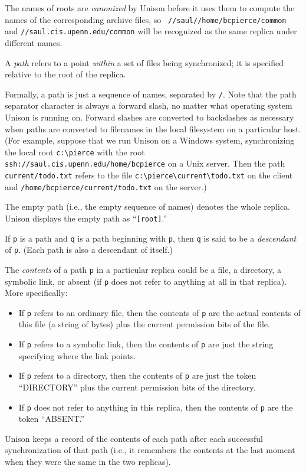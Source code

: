\documentclass{article}
\begin{document}
The names of roots are {\em canonized} by Unison before it uses them
to compute the names of the corresponding archive files, so {\tt
  //saul//home/bcpierce/common} and {\tt //saul.cis.upenn.edu/common}
will be recognized as the same replica under different names.


A {\em path} refers to a point {\em within} a set of files being
synchronized; it is specified relative to the root of the replica.

Formally, a path is just a sequence of names, separated by \verb|/|.
Note that the path separator character is always a forward slash, no
matter what operating system Unison is running on.  Forward slashes
are converted to backslashes as necessary when paths are converted to
filenames in the local filesystem on a particular host.
%
(For example, suppose that we run Unison on a Windows system, synchronizing
the local root \verb|c:\pierce| with the root
\verb|ssh://saul.cis.upenn.edu/home/bcpierce| on a Unix server.  Then
the path \verb|current/todo.txt| refers to the file
\verb|c:\pierce\current\todo.txt| on the client and
\verb|/home/bcpierce/current/todo.txt| on the server.)

The empty path (i.e., the empty sequence of names) denotes the whole
replica.  Unison displays the empty path as ``\verb|[root]|.''

If \verb|p| is a path and \verb|q| is a path beginning with \verb|p|, then
\verb|q| is said to be a {\em descendant} of \verb|p|.  (Each path is also a
descendant of itself.)



The {\em contents} of a path \verb|p| in a particular replica could be a
file, a directory, a symbolic link, or absent (if \verb|p| does not
refer to anything at all in that replica).  More specifically:
\begin{itemize}
\item If \verb|p| refers to an ordinary file, then the
contents of \verb|p| are the actual contents of this file (a string of bytes)
plus the current permission bits of the file.  
\item If \verb|p| refers to a symbolic link, then the contents of \verb|p|
are just the string specifying where the link points.
\item If \verb|p| refers to a directory, then the
contents of \verb|p| are just the token ``DIRECTORY'' plus the current
permission bits of the directory.  
\item If \verb|p| does not refer to anything in this replica, then the
contents of \verb|p| are the token ``ABSENT.''
\end{itemize}
Unison keeps a record of the contents of each path after each
successful synchronization of that path (i.e., it remembers the
contents at the last moment when they were the same in the two
replicas).  
\end{document}
